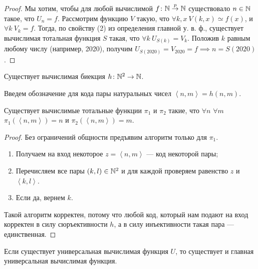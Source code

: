 \begin{proof}
    Мы хотим, чтобы для любой вычислимой $f \colon \mathbb{N} \overset{p}{\to} \mathbb{N}$ существовало $n \in \mathbb{N}$ такое, что $U_{n} = f$.
    Рассмотрим функцию $V$ такую, что $\forall k, x ~ V(k, x) \simeq f(x)$, и $\forall k ~ V_{k} = f$.
    Тогда, по свойству (2) из определения главной у. в. ф., существует вычислимая тотальная функция $S$ такая, что $\forall k~U_{S(k)} = V_{k}$.
    Положив $k$ равным любому числу (например, 2020), получим $U_{S(2020)} = V_{2020} = f \implies n = S(2020)$.
\end{proof}

\begin{statement}
    Существует вычислимая биекция $h \colon \mathbb{N}^{2} \to \mathbb{N}$.
\end{statement}

Введем обозначение для кода пары натуральных чисел $\left< n, m\right> = h(n, m)$.
\begin{statement}
    Существует вычислимые тотальные функции $\pi_{1}$ и $\pi_{2}$ такие, что $\forall n$ $\forall m$ $\pi_{1}(\left< n, m \right>) = n$ и $\pi_{2}(\left< n, m\right>) = m$.
\end{statement}

\begin{proof}
    Без ограничений общности предъявим алгоритм только для $\pi_{1}$.
    \begin{enumerate}[nosep]
        \item Получаем на вход некоторое $z = \left< n, m \right>$ --- код некоторой пары;
        \item Перечисляем все пары $(k, l) \in \mathbb{N}^{2}$ и для каждой проверяем равенство $z$ и $\left< k, l\right>$.
        \item Если да, вернем $k$.
    \end{enumerate}
    Такой алгоритм корректен, потому что любой код, который нам подают на вход корректен в силу сюръективности $h$, а в силу инъективности такая пара --- единственная.
\end{proof}

\begin{theorem}
    Если существует универсальная вычислимая функция $U$, то существует и главная универсальная вычислимая функция.
\end{theorem}


